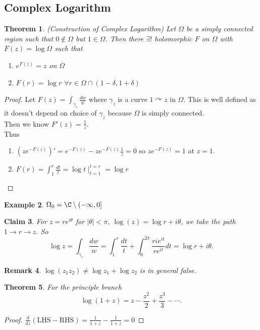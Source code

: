 \documentclass[a4paper]{article}
\newtheorem{thm}{Theorem}[section]
\newtheorem{eg}[thm]{Example}
\newtheorem{claim}[thm]{Claim}
\newtheorem{rmk}[thm]{Remark}
\begin{document}
\subsection{Complex Logarithm}
\begin{thm}
    (Construction of Complex Logarithm) Let $\Omega$ be a simply connected region such that $0\notin \Omega$ but $1\in \Omega$. Then there $\exists !$ holomorphic $F$ on $\Omega$ with $F(z)=\log \Omega$ such that 
    \begin{enumerate}
        \item $e^{F(z)}=z$ on $\Omega$
        \item $F(r)=\log r$ $\forall r\in \Omega \cap (1-\delta,1+\delta)$
    \end{enumerate}
\end{thm}
\begin{proof}
    Let $F(z)=\int_{\gamma_z} \frac{dw}{w}$ where $\gamma_z$ is a curve $1\curvearrowright z$ in $\Omega$. This is well defined as it doesn't depend on choice of $\gamma_z$ because $\Omega$ is simply connected. \\
    Then we know $F'(z)=\frac{1}{z}$. \\
    Thus 
    \begin{enumerate}
        \item $(ze^{-F(z)})'=e^{-F(z)}-ze^{-F(z)} \frac{1}{z}=0$ so $ze^{-F(z)}=1$ at $z=1$. 
        \item $F(r)=\int_1^r \frac{dt}{t}=\log t \mid_{t=1}^{t=r}=\log r$
    \end{enumerate}
\end{proof}
\begin{eg}
    $\Omega_0=\C\setminus (-\infty, 0]$
\end{eg}
\begin{claim}
    For $z=re^{i\theta}$ for $|\theta|<\pi$, $\log(z)=\log r+i\theta$, we take the path $1\to r\to z$. So 
    \[
    \log z=\int_{\gamma_z} \frac{dw}{w}=\int_1^r \frac{dt}{t}+\int_0^{2\pi} \frac{rie^{it}}{r e^{it}}dt=\log r + i\theta
    .\] 
\end{claim}
\begin{rmk}
    $\log(z_1z_2)\neq \log z_1+ \log z_2$ is in general false. 
\end{rmk}
\begin{thm}
    For the principle branch 
    \[
    \log(1+z)=z-\frac{z^2}{2}+\frac{z^3}{3}-\cdots \tag{For $|z|<1$}
    .\]  
\end{thm}
\begin{proof}
    $\frac{d}{dz}(\text{LHS}-\text{RHS})=\frac{1}{1+z}-\frac{1}{1+z}=0$ 
\end{proof}
\end{document}
